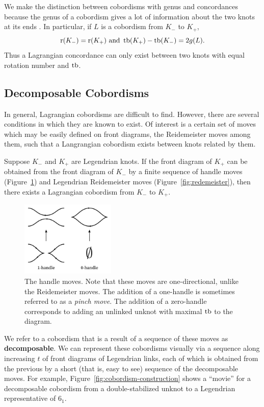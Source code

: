 We make the distinction between cobordisms with genus and concordances because the genus of a cobordism gives a lot of information about the two knots at its ends \cite{chantraine2010}. In particular, if $L$ is a cobordism from $K_-$ to $K_+$,
\[
    \operatorname{r}(K_-) = \operatorname{r}(K_+) \text{     and     } \operatorname{tb}(K_+) - \operatorname{tb}(K_-) = 2g(L).
\]
Thus a Lagrangian concordance can only exist between two knots with equal rotation number and $\operatorname{tb}$.


\subsection{Decomposable Cobordisms}\label{subsec:decomposable}

In general, Lagrangian cobordisms are difficult to find. However, there are several conditions in which they are known to exist. Of interest is a certain set of moves which may be easily defined on front diagrams, the Reidemeister moves among them, such that a Langrangian cobordism exists between knots related by them.

\begin{theorem}
    Suppose $K_-$ and $K_+$ are Legendrian knots. If the front diagram of $K_+$ can be obtained from the front diagram of $K_-$ by a finite sequence of handle moves (Figure~\ref{fig:handles}) and Legendrian Reidemeister moves (Figure~\ref{fig:redemeister}), then there exists a Lagrangian cobordism from $K_-$ to $K_+$. 
\end{theorem}
\begin{figure}[ht!]
    \centering
    \includegraphics[width=0.4\textwidth]{images/handles.pdf}
    \caption{The handle moves. Note that these moves are one-directional, unlike the Reidemeister moves. The addition of a one-handle is sometimes referred to as a \emph{pinch move}. The addition of a zero-handle corresponds to adding an unlinked unknot with maximal $\operatorname{tb}$ to the diagram.}
    \label{fig:handles}
\end{figure}

We refer to a cobordism that is a result of a sequence of these moves as \textbf{decomposable}. We can represent these cobordisms visually via a sequence along increasing $t$ of front diagrams of Legendrian links, each of which is obtained from the previous by a short (that is, easy to see) sequence of the decomposable moves. For example, Figure~\ref{fig:cobordism-construction} shows a ``movie'' for a decomposable cobordism from a double-stabilized unknot to a Legendrian representative of $6_1$.

